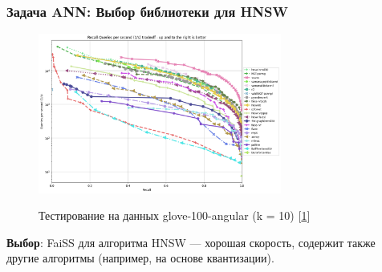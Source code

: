 \documentclass{beamer}
\begin{document}
\begin{frame}

\frametitle{Задача ANN: Выбор библиотеки для HNSW}

\begin{figure}
\centering
\includegraphics[width=8cm]{glove-100-angular_10_angular.png}

Тестирование на данных glove-100-angular (k = 10) [\href{ann-benchmark.com}{\color{blue}1}]
\end{figure}

\textbf{Выбор}: FaiSS для алгоритма HNSW --- хорошая скорость, содержит также другие алгоритмы (например, на основе квантизации).


\end{frame}
\end{document}
